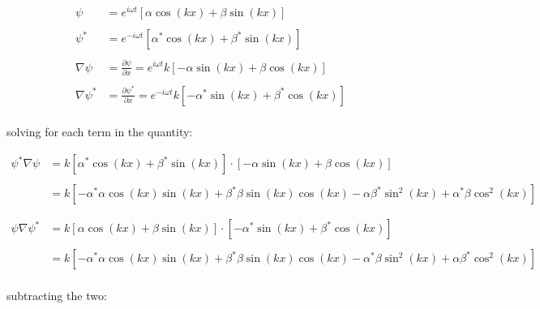 \documentclass{article}
\begin{document}
\begin{align}
%
\psi &= e^{i\omega t} \left[  \alpha \cos{(kx)} + \beta \sin{(kx)}  \right]\nonumber\\
\nonumber\\
%
\psi^{*} &= e^{-i\omega t} \left[  \alpha^{*} \cos{(kx)} + \beta^{*} \sin{(kx)}  \right]\nonumber\\
\nonumber\\
%
\nabla \psi &= \frac{\partial \psi}{\partial x} =  e^{i\omega t} k \left[  -\alpha \sin{(kx)} + \beta \cos{(kx)}  \right]\nonumber\\
\nonumber\\
%
\nabla \psi^{*} &= \frac{\partial \psi^{*}}{\partial x} =  e^{-i\omega t} k \left[  -\alpha^{*} \sin{(kx)} + \beta^{*} \cos{(kx)}  \right]\nonumber
%
\end{align}
\\
solving for each term in the quantity:

\begin{align}
\psi^{*} \nabla \psi &=  k \left[  \alpha^{*} \cos{(kx)} + \beta^{*} \sin{(kx)}  \right] \cdot  \left[  -\alpha \sin{(kx)} + \beta \cos{(kx)}  \right]
%
\nonumber\\\nonumber\\
%
&=  k \left[
-\alpha^{*} \alpha \cos{(kx)} \sin{(kx)} 
+ \beta^{*} \beta \sin{(kx)} \cos{(kx)} 
- \alpha \beta^{*} \sin^{2}{(kx)} 
+ \alpha^{*} \beta \cos^{2}{(kx)}
\right] 
%
\nonumber\\\nonumber\\\nonumber\\
%
 \psi \nabla \psi^{*} &= k \left[  \alpha \cos{(kx)} + \beta \sin{(kx)}  \right] \cdot \left[  -\alpha^{*} \sin{(kx)} + \beta^{*} \cos{(kx)}  \right] 
 \nonumber\\\nonumber\\
 &=  k \left[
-\alpha^{*} \alpha \cos{(kx)} \sin{(kx)} 
+ \beta^{*} \beta \sin{(kx)} \cos{(kx)} 
- \alpha^{*} \beta \sin^{2}{(kx)} 
+ \alpha \beta^{*} \cos^{2}{(kx)}
\right] \nonumber
\end{align}
\\
subtracting the two:
\end{document}
